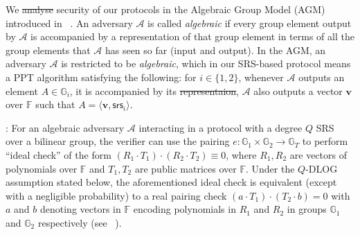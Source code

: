 \documentclass[sigconf]{acmart}
\renewcommand{\vec}{\mathbf} %
\newcommand{\F}{\mathbb{F}}
\newcommand{\G}{\mathbb{G}}
\newcommand{\Gone}{\mathbb{G}_1}
\newcommand{\Gtwo}{\mathbb{G}_2}
\newcommand{\GT}{\mathbb{G}_T}
\newcommand{\srs}{\mathsf{srs}}
\newcommand{\Adv}{\ensuremath{\mathcal{A}}}
\newcommand{\chaya}[1]{\textcolor{cyan}{Chaya: #1}}
\providecommand{\DIFaddtex}[1]{{\protect\color{blue}\uwave{#1}}} %
\providecommand{\DIFdeltex}[1]{{\protect\color{red}\sout{#1}}}                      %
\providecommand{\DIFaddbegin}{} %
\providecommand{\DIFaddend}{} %
\providecommand{\DIFdelbegin}{} %
\providecommand{\DIFdelend}{} %
\providecommand{\DIFadd}[1]{\texorpdfstring{\DIFaddtex{#1}}{#1}} %
\providecommand{\DIFdel}[1]{\texorpdfstring{\DIFdeltex{#1}}{}} %
\newcommand{\DIFscaledelfig}{0.5}
\newlength{\DIFdelgraphicswidth} %
\newlength{\DIFdelgraphicsheight} %
\newcommand{\DIFaddincludegraphics}[2][]{{\color{blue}\fbox{\DIFOincludegraphics[#1]{#2}}}} %
\newcommand{\DIFdelincludegraphics}[2][]{%
	\sbox{\DIFdelgraphicsbox}{\DIFOincludegraphics[#1]{#2}}%
	\settoboxwidth{\DIFdelgraphicswidth}{\DIFdelgraphicsbox} %
	\settoboxtotalheight{\DIFdelgraphicsheight}{\DIFdelgraphicsbox} %
	\scalebox{\DIFscaledelfig}{%
		\parbox[b]{\DIFdelgraphicswidth}{\usebox{\DIFdelgraphicsbox}\\[-\baselineskip] \rule{\DIFdelgraphicswidth}{0em}}\llap{\resizebox{\DIFdelgraphicswidth}{\DIFdelgraphicsheight}{%
				\setlength{\unitlength}{\DIFdelgraphicswidth}%
				\begin{picture}(1,1)%
					\thicklines\linethickness{2pt} %
					{\color[rgb]{1,0,0}\put(0,0){\framebox(1,1){}}}%
					{\color[rgb]{1,0,0}\put(0,0){\line( 1,1){1}}}%
					{\color[rgb]{1,0,0}\put(0,1){\line(1,-1){1}}}%
				\end{picture}%
			}\hspace*{3pt}}} %
} %
\DeclareRobustCommand{\DIFaddbegin}{\DIFOaddbegin \let\includegraphics\DIFaddincludegraphics} %
\DeclareRobustCommand{\DIFaddend}{\DIFOaddend \let\includegraphics\DIFOincludegraphics} %
\DeclareRobustCommand{\DIFdelbegin}{\DIFOdelbegin \let\includegraphics\DIFdelincludegraphics} %
\DeclareRobustCommand{\DIFdelend}{\DIFOaddend \let\includegraphics\DIFOincludegraphics} %
\begin{document}
	\DIFaddbegin \smallskip
	
	\DIFaddend {} 
	We \DIFdelbegin \DIFdel{analyse }\DIFdelend \DIFaddbegin \DIFadd{analyze }\DIFaddend security of our protocols in the Algebraic Group Model (AGM) introduced
	in ~\cite{C:FucKilLos18}. An adversary $\Adv$ is called \textit{algebraic} if every group element output by $\Adv$ is accompanied by a representation of that group element in terms of all the group elements that $\Adv$ has seen so far (input and output).
	In the AGM, an adversary $\Adv$ is restricted to be {\em algebraic}, which in our SRS-based protocol means a PPT algorithm satisfying the following:
	for $i\in \{1,2\}$, whenever $\Adv$ outputs an element $A\in \G_i$, it is accompanied by its \DIFdelbegin \DIFdel{representaion}\DIFdelend \DIFaddbegin \DIFadd{representation}\DIFaddend , $\Adv$ also outputs a vector $\vec{v}$
	over $\F$ such that $A=\langle \vec{v},\srs_i\rangle$.
	
	\DIFaddbegin \smallskip
	
	\DIFaddend {}: For an algebraic adversary $\Adv$ interacting in a protocol with a degree $Q$ SRS over a bilinear group, the verifier
	can use the pairing $e:\Gone\times \Gtwo\rightarrow \GT$ to perform ``ideal check'' of the form $(R_1\cdot T_1)\cdot (R_2\cdot T_2)\equiv 0$, where $R_1,R_2$ are
	vectors of polynomials over $\F$ and $T_1, T_2$ are public matrices over $\F$.
	Under the $Q$-DLOG assumption stated below, the aforementioned ideal check
	is equivalent (except with a negligible probability) to a real pairing check $(a\cdot T_1)\cdot (T_2\cdot b)=0$ with $a$ and $b$ denoting vectors in $\F$ encoding polynomials in $R_1$ and $R_2$ in
	groups $\Gone$ and $\Gtwo$ respectively (see ~\cite[Lemma 2.2]{Gabizon2019PLONKPO}).
	\DIFaddbegin 
	
\end{document}
